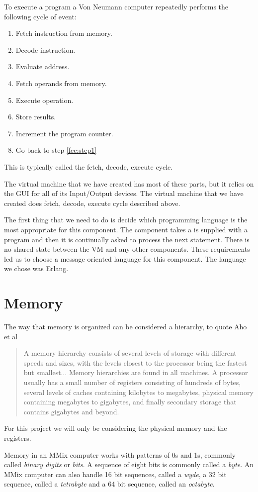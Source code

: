 \documentclass[a4paper,11pt]{report}
\begin{document}
To execute a program a Von Neumann computer repeatedly performs the following cycle of event:
\begin{enumerate}
\item Fetch instruction from memory.\label{fec:step1}
\item Decode instruction.
\item Evaluate address.
\item Fetch operands from memory.
\item Execute operation.
\item Store results.
\item Increment the program counter.
\item Go back to step \ref{fec:step1}
\end{enumerate}

This is typically called the fetch, decode, execute cycle.

The virtual machine that we have created has most of these parts, but it relies on the GUI for all of its Input/Output devices. The virtual machine that we have created does fetch, decode, execute cycle described above.

The first thing that we need to do is decide which programming language is the most appropriate for this component. The component takes a is supplied with a program and then it is continually asked to process the next statement. There is no shared state between the VM and any other components. These requirements led us to choose a message oriented language for this component. The language we chose was Erlang.
\section{Memory}
The way that memory is organized can be considered a hierarchy, to quote Aho et al\cite{dragon}
\begin{quotation}
A memory hierarchy consists of several levels of storage with different speeds and sizes, with the levels closest to the processor being the fastest but smallest... Memory hierarchies are found in all machines. A processor usually has a small number of registers consisting of hundreds of bytes, several levels of caches containing kilobytes to megabytes, physical memory containing megabytes to gigabytes, and finally secondary storage that contains gigabytes and beyond.
\end{quotation}
For this project we will only be considering the physical memory and the registers.

Memory in an MMix computer works with patterns of 0s and 1s, commonly called \textit{binary digits} or \textit{bits}. A sequence of eight bits is commonly called a \textit{byte}. An MMix computer can also handle 16 bit sequences, called a \textit{wyde}, a 32 bit sequence, called a \textit{tetrabyte} and a 64 bit sequence, called an \textit{octabyte}.
\end{document}
